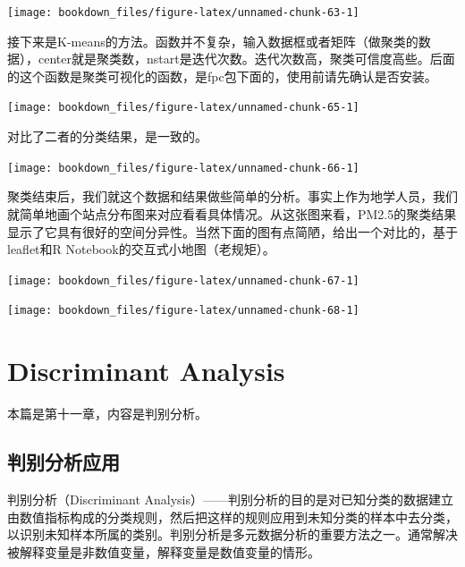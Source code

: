 \documentclass[]{ctexbook}
\newenvironment{Shaded}{\begin{snugshade}}{\end{snugshade}}
\newcommand{\DataTypeTok}[1]{\textcolor[rgb]{0.13,0.29,0.53}{#1}}
\newcommand{\DecValTok}[1]{\textcolor[rgb]{0.00,0.00,0.81}{#1}}
\newcommand{\KeywordTok}[1]{\textcolor[rgb]{0.13,0.29,0.53}{\textbf{#1}}}
\newcommand{\NormalTok}[1]{#1}
\newcommand{\OperatorTok}[1]{\textcolor[rgb]{0.81,0.36,0.00}{\textbf{#1}}}
\newcommand{\StringTok}[1]{\textcolor[rgb]{0.31,0.60,0.02}{#1}}
\begin{document}
\texttt{[image: bookdown\_files/figure-latex/unnamed-chunk-63-1]}

接下来是K-means的方法。函数并不复杂，输入数据框或者矩阵（做聚类的数据），center就是聚类数，nstart是迭代次数。迭代次数高，聚类可信度高些。后面的这个函数是聚类可视化的函数，是fpc包下面的，使用前请先确认是否安装。

\begin{Shaded}
\end{Shaded}

\texttt{[image: bookdown\_files/figure-latex/unnamed-chunk-65-1]}

对比了二者的分类结果，是一致的。

\texttt{[image: bookdown\_files/figure-latex/unnamed-chunk-66-1]}

聚类结束后，我们就这个数据和结果做些简单的分析。事实上作为地学人员，我们就简单地画个站点分布图来对应看看具体情况。从这张图来看，PM2.5的聚类结果显示了它具有很好的空间分异性。当然下面的图有点简陋，给出一个对比的，基于leaflet和R Notebook的交互式小地图（老规矩）。

\texttt{[image: bookdown\_files/figure-latex/unnamed-chunk-67-1]}

\texttt{[image: bookdown\_files/figure-latex/unnamed-chunk-68-1]}

\hypertarget{discriminant}{%
\chapter{Discriminant Analysis}\label{discriminant}}

本篇是第十一章，内容是判别分析。

\hypertarget{ux5224ux522bux5206ux6790ux5e94ux7528}{%
\section{判别分析应用}\label{ux5224ux522bux5206ux6790ux5e94ux7528}}

判别分析（Discriminant Analysis）------判别分析的目的是对已知分类的数据建立由数值指标构成的分类规则，然后把这样的规则应用到未知分类的样本中去分类，以识别未知样本所属的类别。判别分析是多元数据分析的重要方法之一。通常解决被解释变量是非数值变量，解释变量是数值变量的情形。
\end{document}
